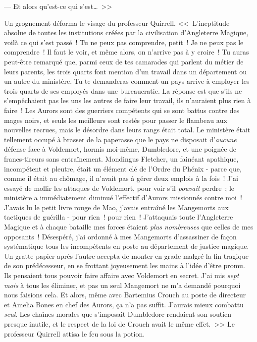 --- Et alors qu'est-ce qui s'est…~>>

Un grognement déforma le visage du professeur Quirrell. <<~L'ineptitude absolue de toutes les institutions créées par la civilisation d'Angleterre Magique, voilà ce qui s'est passé~! Tu ne peux pas comprendre, petit~! Je ne peux pas le comprendre~! Il faut le voir, et même alors, on n'arrive pas à y croire~! Tu auras peut-être remarqué que, parmi ceux de tes camarades qui parlent du métier de leurs parents, les trois quarts font mention d'un travail dans un département ou un autre du ministère. Tu te demanderas comment un pays arrive à employer les trois quarts de ses employés dans une bureaucratie. La réponse est que s'ils ne s'empêchaient pas les uns les autres de faire leur travail, ils n'auraient plus rien à faire~! Les Aurors sont des guerriers compétents qui se sont battus contre des mages noirs, et seuls les meilleurs sont restés pour passer le flambeau aux nouvelles recrues, mais le désordre dans leurs rangs était total. Le ministère était tellement occupé à brasser de la paperasse que le pays ne disposait d'\emph{aucune} défense face à Voldemort, hormis moi-même, Dumbledore, et une poignée de francs-tireurs sans entraînement. Mondingus Fletcher, un fainéant apathique, incompétent et pleutre, était un élément clé de l'Ordre du Phénix - parce que, comme il était au chômage, il n'avait pas à gérer deux emplois à la fois~! J'ai essayé de mollir les attaques de Voldemort, pour voir s'il \emph{pouvait} perdre~; le ministère a immédiatement diminué l'effectif d'Aurors missionnés contre moi~! J'avais lu le petit livre rouge de Mao, j'avais entraîné les Mangemorts aux tactiques de guérilla - pour rien~! pour rien~! J'attaquais toute l'Angleterre Magique et à chaque bataille mes forces étaient \emph{plus nombreuses} que celles de mes opposants~! Désespéré, j'ai ordonné à mes Mangemorts d'assassiner de façon systématique tous les incompétents en poste au département de justice magique. Un gratte-papier après l'autre accepta de monter en grade malgré la fin tragique de son prédécesseur, en se frottant joyeusement les mains à l'idée d'être promu. Ils pensaient tous pouvoir faire affaire avec Voldemort en secret. J'ai mis \emph{sept mois} à tous les éliminer, et pas un seul Mangemort ne m'a demandé pourquoi nous faisions cela. Et alors, même avec Bartemius Crouch au poste de directeur et Amelia Bones en chef des Aurors, ça n'a pas suffit. J'aurais mieux combattu \emph{seul}. Les chaînes morales que s'imposait Dumbledore rendaient son soutien presque inutile, et le respect de la loi de Crouch avait le même effet.~>> Le professeur Quirrell attisa le feu sous la potion.

